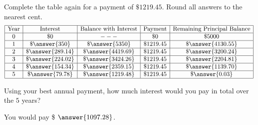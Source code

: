 \documentclass{ximera}
\begin{document}
\begin{question}[0in]

  Complete the table again for a payment
  of $\$1219.45$.  Round all answers to the nearest cent.
  \[
  \begin{array}{|c|c|c|c|c|}
    \hline
    \text{Year} & \text{Interest}             & \text{Balance with Interest} & \text{Payment}    & \text{Remaining Principal Balance}\\ \hline
    0  & \$ 0               & ---                   & \$ 0        & \$ 5000 \\ \hline
    1  & \$ \answer{350}    & \$ \answer{5350}    & \$ 1219.45  & \$ \answer{4130.55} \\ \hline
    2  & \$ \answer{289.14} & \$ \answer{4419.69} & \$ 1219.45  & \$ \answer{3200.24} \\ \hline
    3  & \$ \answer{224.02} & \$ \answer{3424.26} & \$ 1219.45  & \$ \answer{2204.81} \\ \hline
    4  & \$ \answer{154.34} & \$ \answer{2359.15} & \$ 1219.45  & \$ \answer{1139.70} \\ \hline
    5  & \$ \answer{79.78}  & \$ \answer{1219.48} & \$ 1219.45  & \$ \answer{0.03} \\ \hline
    \end{array}
  \]

\end{question}

\begin{question}
Using your best annual payment, how much interest would you pay in total over the $5$ years? 
\begin{prompt}
  You would pay \$ $\answer{1097.28}$.
\end{prompt}
\end{question}



\end{document}
